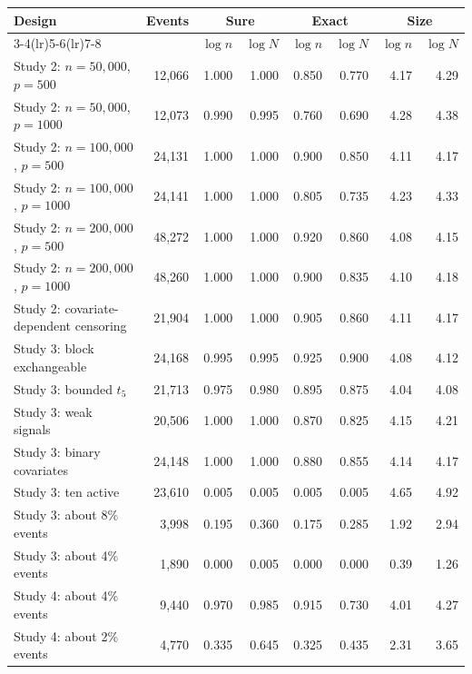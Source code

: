\begin{tabular}{lrrrrrrr}
\toprule
Design & Events & \multicolumn{2}{c}{Sure} & \multicolumn{2}{c}{Exact} & \multicolumn{2}{c}{Size}\\
\cmidrule(lr){3-4}\cmidrule(lr){5-6}\cmidrule(lr){7-8}
 & & \(\log n\) & \(\log N\) & \(\log n\) & \(\log N\) & \(\log n\) & \(\log N\)\\
\midrule
Study 2: \(n=50{,}000\), \(p=500\) & 12,066 & 1.000 & 1.000 & 0.850 & 0.770 & 4.17 & 4.29\\
Study 2: \(n=50{,}000\), \(p=1000\) & 12,073 & 0.990 & 0.995 & 0.760 & 0.690 & 4.28 & 4.38\\
Study 2: \(n=100{,}000\), \(p=500\) & 24,131 & 1.000 & 1.000 & 0.900 & 0.850 & 4.11 & 4.17\\
Study 2: \(n=100{,}000\), \(p=1000\) & 24,141 & 1.000 & 1.000 & 0.805 & 0.735 & 4.23 & 4.33\\
Study 2: \(n=200{,}000\), \(p=500\) & 48,272 & 1.000 & 1.000 & 0.920 & 0.860 & 4.08 & 4.15\\
Study 2: \(n=200{,}000\), \(p=1000\) & 48,260 & 1.000 & 1.000 & 0.900 & 0.835 & 4.10 & 4.18\\
Study 2: covariate-dependent censoring & 21,904 & 1.000 & 1.000 & 0.905 & 0.860 & 4.11 & 4.17\\
Study 3: block exchangeable & 24,168 & 0.995 & 0.995 & 0.925 & 0.900 & 4.08 & 4.12\\
Study 3: bounded \(t_5\) & 21,713 & 0.975 & 0.980 & 0.895 & 0.875 & 4.04 & 4.08\\
Study 3: weak signals & 20,506 & 1.000 & 1.000 & 0.870 & 0.825 & 4.15 & 4.21\\
Study 3: binary covariates & 24,148 & 1.000 & 1.000 & 0.880 & 0.855 & 4.14 & 4.17\\
Study 3: ten active & 23,610 & 0.005 & 0.005 & 0.005 & 0.005 & 4.65 & 4.92\\
Study 3: about 8\% events & 3,998 & 0.195 & 0.360 & 0.175 & 0.285 & 1.92 & 2.94\\
Study 3: about 4\% events & 1,890 & 0.000 & 0.005 & 0.000 & 0.000 & 0.39 & 1.26\\
Study 4: about 4\% events & 9,440 & 0.970 & 0.985 & 0.915 & 0.730 & 4.01 & 4.27\\
Study 4: about 2\% events & 4,770 & 0.335 & 0.645 & 0.325 & 0.435 & 2.31 & 3.65\\
\bottomrule
\end{tabular}
